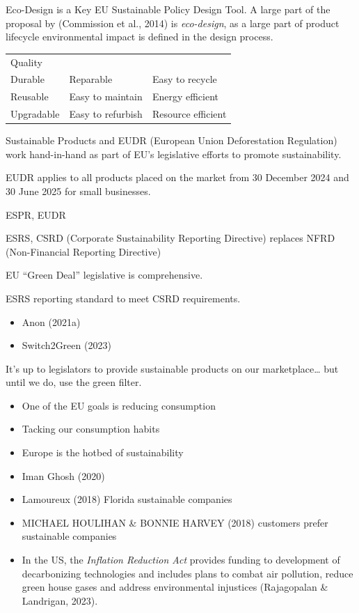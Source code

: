 \documentclass[
  letterpaper,
  DIV=11,
  numbers=noendperiod]{scrartcl}
\providecommand{\tightlist}{%
  \setlength{\itemsep}{0pt}\setlength{\parskip}{0pt}}\usepackage{longtable,booktabs,array}
\begin{document}
Eco-Design is a Key EU Sustainable Policy Design Tool. A large part of
the proposal by (Commission et al., 2014) is \emph{eco-design}, as a
large part of product lifecycle environmental impact is defined in the
design process.

\begin{longtable}[]{@{}lll@{}}
\toprule\noalign{}
\endhead
\bottomrule\noalign{}
\endlastfoot
Quality & & \\
Durable & Reparable & Easy to recycle \\
Reusable & Easy to maintain & Energy efficient \\
Upgradable & Easy to refurbish & Resource efficient \\
\end{longtable}

Sustainable Products and EUDR (European Union Deforestation Regulation)
work hand-in-hand as part of EU's legislative efforts to promote
sustainability.

EUDR applies to all products placed on the market from 30 December 2024
and 30 June 2025 for small businesses.

ESPR, EUDR

ESRS, CSRD (Corporate Sustainability Reporting Directive) replaces NFRD
(Non-Financial Reporting Directive)

EU ``Green Deal'' legislative is comprehensive.

ESRS reporting standard to meet CSRD requirements.

\begin{itemize}
\tightlist
\item
  Anon (2021a)
\item
  Switch2Green (2023)
\end{itemize}

It's up to legislators to provide sustainable products on our
marketplace\ldots{} but until we do, use the green filter.

\begin{itemize}
\tightlist
\item
  One of the EU goals is reducing consumption
\item
  Tacking our consumption habits
\item
  Europe is the hotbed of sustainability
\item
  Iman Ghosh (2020)
\item
  Lamoureux (2018) Florida sustainable companies
\item
  MICHAEL HOULIHAN \& BONNIE HARVEY (2018) customers prefer sustainable
  companies
\item
  In the US, the \emph{Inflation Reduction Act} provides funding to
  development of decarbonizing technologies and includes plans to combat
  air pollution, reduce green house gases and address environmental
  injustices (Rajagopalan \& Landrigan, 2023).
\end{itemize}
\end{document}
